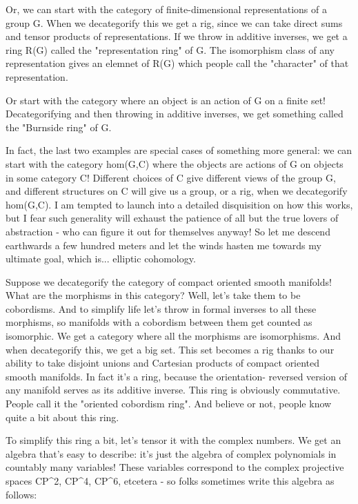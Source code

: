 Or, we can start with the category of finite-dimensional representations
of a group G.  When we decategorify this we get a rig, since we can take
direct sums and tensor products of representations.  If we throw in
additive inverses, we get a ring R(G) called the "representation
ring" of G.  The isomorphism class of any representation gives an
elemnet of R(G) which people call the "character" of that
representation.

Or start with the category where an object is an action of G on a finite 
set!  Decategorifying and then throwing in additive inverses, we get 
something called the "Burnside ring" of G.

In fact, the last two examples are special cases of something more
general: we can start with the category hom(G,C) where the objects 
are actions of G on objects in some category C!  Different choices 
of C give different views of the group G, and different structures
on C will give us a group, or a rig, when we decategorify hom(G,C).
I am tempted to launch into a detailed disquisition on how this works, 
but I fear such generality will exhaust the patience of all but the 
true lovers of abstraction - who can figure it out for themselves anyway!  
So let me descend earthwards a few hundred meters and let the winds 
hasten me towards my ultimate goal, which is... elliptic cohomology.

Suppose we decategorify the category of compact oriented smooth manifolds!
What are the morphisms in this category?  Well, let's take them to be
cobordisms.  And to simplify life let's throw in formal inverses to all
these morphisms, so manifolds with a cobordism between them get counted
as isomorphic.  We get a category where all the morphisms are isomorphisms.
And when decategorify this, we get a big set.  This set becomes a rig thanks
to our ability to take disjoint unions and Cartesian products of compact
oriented smooth manifolds.   In fact it's a ring, because the orientation-
reversed version of any manifold serves as its additive inverse.  This
ring is obviously commutative.  People call it the "oriented cobordism ring".  
And believe or not, people know quite a bit about this ring.

To simplify this ring a bit, let's tensor it with the complex numbers.
We get an algebra that's easy to describe: it's just the algebra of
complex polynomials in countably many variables!  These variables correspond 
to the complex projective spaces CP^{2}, CP^{4}, 
CP^{6}, etcetera - so folks
sometimes write this algebra as follows:


